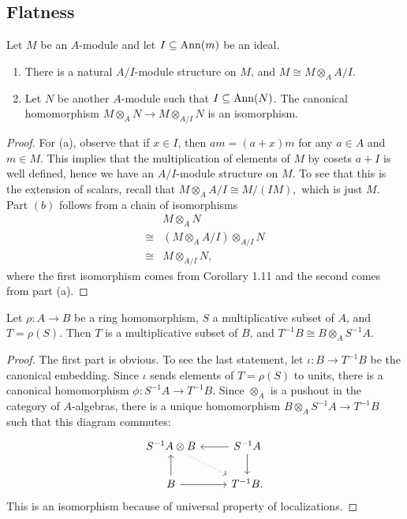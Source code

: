 \subsection{Flatness}

\begin{exer}
	Let $M$ be an $A$-module and let $I \subseteq \operatorname{Ann}(m)$ be an ideal.
	\begin{enumerate}[label=(\alph*)]
		\item There is a natural $A/I$-module structure on $M$, and
		$M \cong M \otimes_A A/I$.
		\item Let $N$ be another $A$-module such that
		$I \subseteq \operatorname{Ann}(N)$. The canonical homomorphism
		$M \otimes_A N \to M \otimes_{A/I} N$ is an isomorphism.
	\end{enumerate}	
\end{exer}
\begin{proof}
	For (a), observe that if $x \in I$, then $am = (a + x)m$ for any
	$a \in A$ and $m \in M$. This implies that the multiplication of
	elements of $M$ by cosets $a + I$ is well defined, hence we have an
	$A/I$-module structure on $M$. To see that this is the extension of
	scalars, recall that $M \otimes_A A/I \cong M/(IM),$ which is just $M$.
	\\

	Part $(b)$ follows from a chain of isomorphisms
	\begin{align*}
		& M \otimes_A N\\
		\cong & (M \otimes_A A/I) \otimes_{A/I} N\\
		\cong & M \otimes_{A/I} N,
	\end{align*}
	where the first isomorphism comes from Corollary 1.11 and the second
	comes from part (a).
\end{proof}

\begin{exer}
	Let $\rho: A \to B$ be a ring homomorphism, $S$ a multiplicative subset
	of $A$, and $T = \rho(S)$. Then $T$ is a multiplicative subset of $B$,
	and $T^{-1}B \cong B \otimes_A S^{-1}A$.
\end{exer}
\begin{proof}
	The first part is obvious. To see the last statement, let
	$\iota: B \to T^{-1}B$ be the canonical embedding. Since $\iota$ sends
	elements of $T = \rho(S)$ to units, there is a canonical homomorphism
	$\phi: S^{-1}A \to T^{-1}B$. Since $\otimes_A$ is a pushout in the
	category of $A$-algebras, there is a unique homomorphism
	$B \otimes_A S^{-1}A \to T^{-1}B$ such that this diagram commutes:
	\[
	\begin{tikzcd}
		S^{-1}A \otimes B \arrow[dr, dotted] & S^{-1}A \arrow[l] 
			\arrow[d]\\
		B \arrow[u] \arrow[r] & T^{-1}B.
	\end{tikzcd}
	\]
	This is an isomorphism because of universal property of localizations.
\end{proof}

